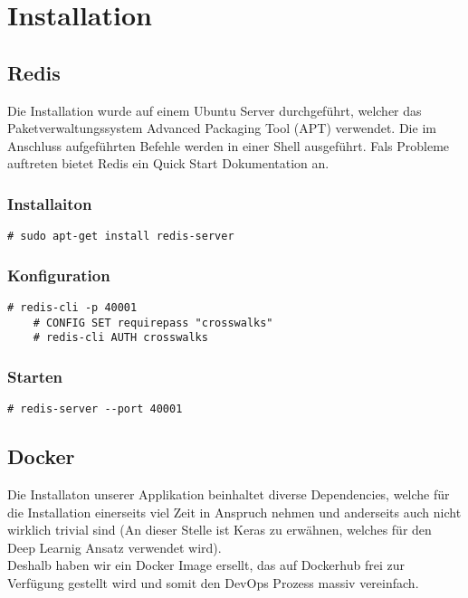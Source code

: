 \section{Installation}
\subsection{Redis}
\label{subsec:redis}
Die Installation wurde auf einem Ubuntu Server durchgeführt, welcher das Paketverwaltungssystem Advanced Packaging Tool (APT) verwendet. Die im Anschluss aufgeführten Befehle werden in einer Shell ausgeführt.
Fals Probleme auftreten bietet Redis ein Quick Start Dokumentation an.

\subsubsection{Installaiton}
\begin{lstlisting}[style=BashInputStyle]
	# sudo apt-get install redis-server
\end{lstlisting}

\subsubsection{Konfiguration}
\begin{lstlisting}[style=BashInputStyle]
	# redis-cli -p 40001
	# CONFIG SET requirepass "crosswalks"
	# redis-cli AUTH crosswalks
\end{lstlisting}

\subsubsection{Starten}
\begin{lstlisting}[style=BashInputStyle]
	# redis-server --port 40001
\end{lstlisting}

\newpage

\subsection{Docker}
\label{subsec:docker}
Die Installaton unserer Applikation beinhaltet diverse Dependencies, welche für die Installation einerseits viel Zeit in Anspruch nehmen und anderseits auch nicht wirklich trivial sind (An dieser Stelle ist Keras zu erwähnen, welches für den Deep Learnig Ansatz verwendet wird). \\
Deshalb haben wir ein Docker Image ersellt, das auf Dockerhub \cite{DokerCrosswalk} frei zur Verfügung gestellt wird und somit den DevOps Prozess massiv vereinfach.\\


